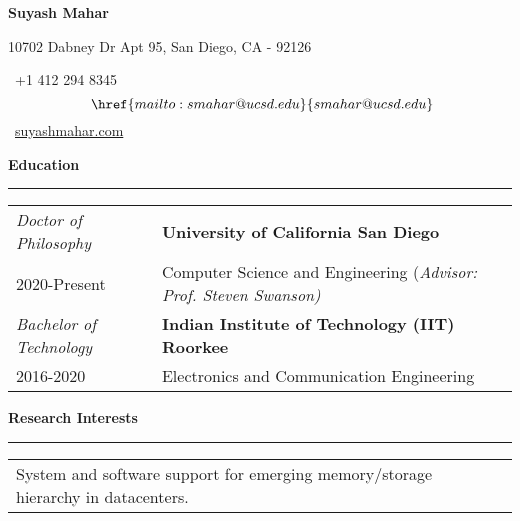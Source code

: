 \documentclass{article}
\makeatletter
\newcommand*{\bigcdot}{}%
\DeclareRobustCommand*{\bigcdot}{%
  \mathbin{\mathpalette\bigcdot@{}}%
}
\newcommand*{\bigcdot@scalefactor}{.5}
\newcommand*{\bigcdot@widthfactor}{1.15}
\newcommand*{\bigcdot@}[2]{%
  \sbox0{$#1\vcenter{}$}%
  \sbox2{$#1\cdot\m@th$}%
  \hbox to \bigcdot@widthfactor\wd2{%
    \hfil
    \raise\ht0\hbox{%
      \scalebox{\bigcdot@scalefactor}{%
        \lower\ht0\hbox{$#1\bullet\m@th$}%
      }%
    }%
    \hfil
  }%
}
\newcommand{\sectiontitle}[1]{
  \textbf{\Large{\sffamily #1}}
  \begin{flushright}
      \vspace{-0.48cm} 
      \rule{0.975\textwidth}{1.1pt}
  \end{flushright}
  \vspace{-0.1cm} 
}
\makeatother
\begin{document}
\thispagestyle{firstpage}

\begin{singlespace}
    \begin{center}
        \textbf{\Huge \sffamily Suyash Mahar}
    \end{center}

    \begin{center}
        \vspace{-0.1cm}
        10702 Dabney Dr Apt 95, San Diego, CA - 92126
    \end{center}

    \begin{center}
        \vspace{-0.2cm}
        \faPhone\ +1 412 294 8345 $\bigcdot$
        \faEnvelope\ \href{mailto:smahar@ucsd.edu}
        {smahar@ucsd.edu} $\bigcdot$ \faGlobe\ \href{https://suyashmahar.com}{suyashmahar.com} %
    \end{center}
\end{singlespace}

\sectiontitle{Education}

\begin{tabular}{p{} p{}}
  \hfill \textit{Doctor of Philosophy}           & \large\textbf{University of California San Diego} \\
  \hfill \footnotesize 2020-Present              & Computer Science and Engineering (\textit{Advisor: Prof. Steven Swanson)}\\[2mm]
  \hfill \textit{Bachelor of Technology}         & \large \textbf{Indian Institute of Technology (IIT) Roorkee} \\
  \hfill \footnotesize 2016-2020                 & Electronics and Communication Engineering\\
\end{tabular} 

\vspace{2mm}

\sectiontitle{Research Interests}

\begin{tabular}{p{} p{}} 
  System and software support for emerging memory/storage hierarchy in datacenters.&\\
\end{tabular}
\vspace{4mm}
\end{document}
